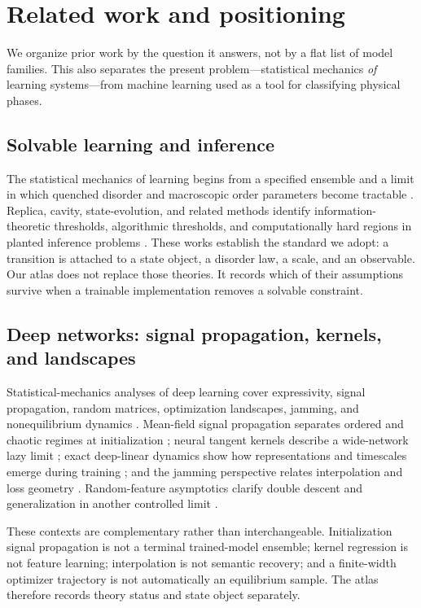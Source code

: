\section{Related work and positioning}
\label{sec:frontier}

We organize prior work by the question it answers, not by a flat list of model
families. This also separates the present problem---statistical mechanics
\emph{of} learning systems---from machine learning used as a tool for classifying
physical phases.

\subsection{Solvable learning and inference}

The statistical mechanics of learning begins from a specified ensemble and a
limit in which quenched disorder and macroscopic order parameters become
tractable \cite{engel2001statistical,mezard2009information}. Replica, cavity,
state-evolution, and related methods identify information-theoretic thresholds,
algorithmic thresholds, and computationally hard regions in planted inference
problems \cite{zdeborova2016statistical}. These works establish the standard we
adopt: a transition is attached to a state object, a disorder law, a scale, and
an observable. Our atlas does not replace those theories. It records which of
their assumptions survive when a trainable implementation removes a solvable
constraint.

\subsection{Deep networks: signal propagation, kernels, and landscapes}

Statistical-mechanics analyses of deep learning cover expressivity, signal
propagation, random matrices, optimization landscapes, jamming, and
nonequilibrium dynamics \cite{bahri2020statistical}. Mean-field signal
propagation separates ordered and chaotic regimes at initialization
\cite{schoenholz2017deep}; neural tangent kernels describe a wide-network lazy
limit \cite{jacot2018neural}; exact deep-linear dynamics show how representations
and timescales emerge during training \cite{saxe2019mathematical}; and the
jamming perspective relates interpolation and loss geometry
\cite{geiger2019jamming}. Random-feature asymptotics clarify double descent and
generalization in another controlled limit \cite{mei2022generalization}.

These contexts are complementary rather than interchangeable. Initialization
signal propagation is not a terminal trained-model ensemble; kernel regression
is not feature learning; interpolation is not semantic recovery; and a
finite-width optimizer trajectory is not automatically an equilibrium sample.
The atlas therefore records theory status and state object separately.

